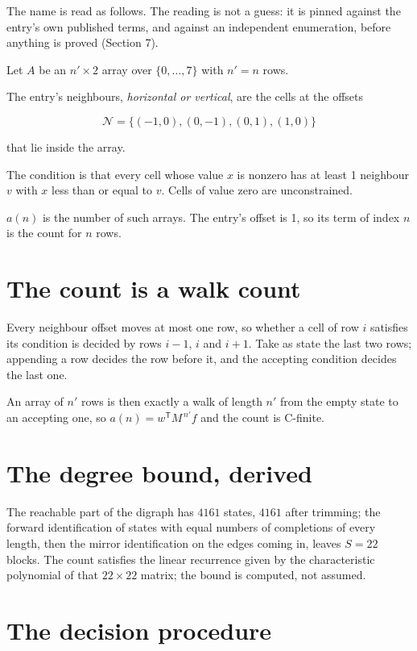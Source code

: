 \documentclass[11pt]{article}
\theoremstyle{definition}
\begin{document}
The name is read as follows. The reading is not a guess: it is pinned against the entry's own published terms, and against an independent enumeration, before anything is proved (Section 7).

Let $A$ be an $n' \times 2$ array over $\{0,\dots,7\}$ with $n' = n$ rows.

The entry's neighbours, {\itshape horizontal or vertical}, are the cells at the offsets

\[\mathcal{N} = \{(-1,0), (0,-1), (0,1), (1,0)\}\]

that lie inside the array.

The condition is that every cell whose value $x$ is nonzero has at least 1 neighbour $v$ with $x$ less than or equal to $v$. Cells of value zero are unconstrained.

$a(n)$ is the number of such arrays. The entry's offset is 1, so its term of index $n$ is the count for $n$ rows.

\section{The count is a walk count}

Every neighbour offset moves at most one row, so whether a cell of row $i$ satisfies its condition is decided by rows $i-1$, $i$ and $i+1$. Take as state the last two rows; appending a row decides the row before it, and the accepting condition decides the last one.

An array of $n'$ rows is then exactly a walk of length $n'$ from the empty state to an accepting one, so $a(n) = w^{\mathsf T}M^{\,n'}f$ and the count is C-finite.

\section{The degree bound, derived}

The reachable part of the digraph has $4161$ states, $4161$ after trimming; the forward identification of states with equal numbers of completions of every length, then the mirror identification on the edges coming in, leaves $S = 22$ blocks. The count satisfies the linear recurrence given by the characteristic polynomial of that $22\times22$ matrix; the bound is computed, not assumed.

\section{The decision procedure}
\end{document}

